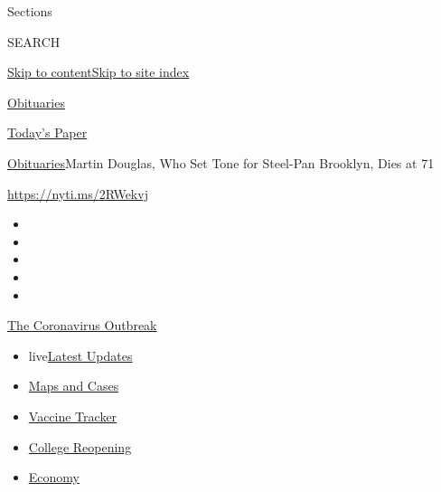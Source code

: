 Sections

SEARCH

\protect\hyperlink{site-content}{Skip to
content}\protect\hyperlink{site-index}{Skip to site index}

\href{https://www.nytimes3xbfgragh.onion/section/obituaries}{Obituaries}

\href{https://myaccount.nytimes3xbfgragh.onion/auth/login?response_type=cookie\&client_id=vi}{}

\href{https://www.nytimes3xbfgragh.onion/section/todayspaper}{Today's
Paper}

\href{/section/obituaries}{Obituaries}\textbar{}Martin Douglas, Who Set
Tone for Steel-Pan Brooklyn, Dies at 71

\url{https://nyti.ms/2RWekvj}

\begin{itemize}
\item
\item
\item
\item
\item
\end{itemize}

\href{https://www.nytimes3xbfgragh.onion/news-event/coronavirus?action=click\&pgtype=Article\&state=default\&region=TOP_BANNER\&context=storylines_menu}{The
Coronavirus Outbreak}

\begin{itemize}
\tightlist
\item
  live\href{https://www.nytimes3xbfgragh.onion/2020/08/04/world/coronavirus-covid-19.html?action=click\&pgtype=Article\&state=default\&region=TOP_BANNER\&context=storylines_menu}{Latest
  Updates}
\item
  \href{https://www.nytimes3xbfgragh.onion/interactive/2020/us/coronavirus-us-cases.html?action=click\&pgtype=Article\&state=default\&region=TOP_BANNER\&context=storylines_menu}{Maps
  and Cases}
\item
  \href{https://www.nytimes3xbfgragh.onion/interactive/2020/science/coronavirus-vaccine-tracker.html?action=click\&pgtype=Article\&state=default\&region=TOP_BANNER\&context=storylines_menu}{Vaccine
  Tracker}
\item
  \href{https://www.nytimes3xbfgragh.onion/2020/08/02/us/covid-college-reopening.html?action=click\&pgtype=Article\&state=default\&region=TOP_BANNER\&context=storylines_menu}{College
  Reopening}
\item
  \href{https://www.nytimes3xbfgragh.onion/live/2020/08/03/business/stock-market-today-coronavirus?action=click\&pgtype=Article\&state=default\&region=TOP_BANNER\&context=storylines_menu}{Economy}
\end{itemize}

